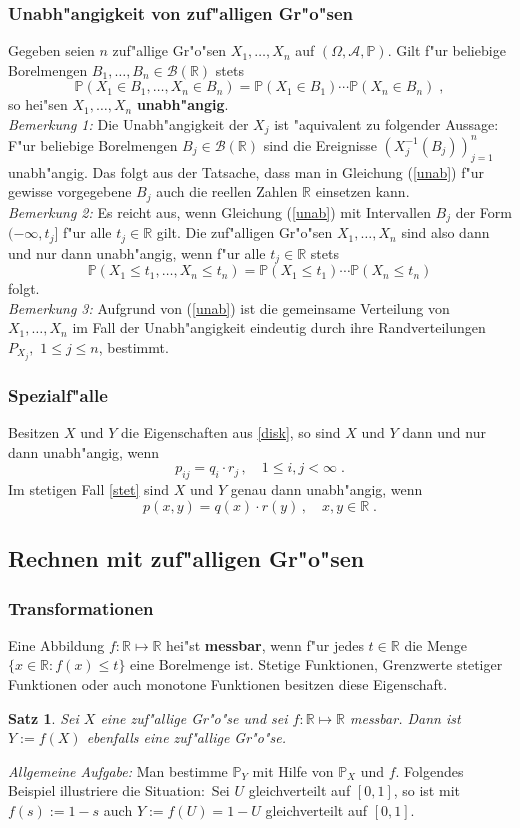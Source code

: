 \documentclass[ngerman,draft,parskip=half,twoside]{scrartcl}
\newtheorem{thm}{Satz}[section]
\newcommand*{\R}{\mathbb{R}}      %
\newcommand*{\Algeb}{\mathcal{A}}   %
\newcommand*{\BorelM}{\mathcal{B}}  %
\newcommand*{\WKM}{\mathbb{P}}      %
\begin{document}
\subsubsection{Unabh"angigkeit von zuf"alligen Gr"o"sen}
Gegeben seien $n$ zuf"allige Gr"o"sen $X_1,\ldots,X_n$ auf $(\Omega,\Algeb,\WKM)$. Gilt f"ur beliebige
Borelmengen $B_1,\ldots,B_n\in\BorelM(\R)$ stets
\begin{equation}
\label{unab}
\WKM(X_1\in B_1,\ldots,X_n\in B_n)=\WKM(X_1\in B_1)\cdots\WKM(X_n\in B_n)\;,
\end{equation}
so hei"sen $X_1,\ldots,X_n$ \textbf{unabh"angig}.\\
\textit{Bemerkung 1:} Die Unabh"angigkeit der $X_j$ ist "aquivalent zu folgender Aussage$\colon$ F"ur
beliebige Borelmengen $B_j\in\BorelM(\R)$ sind die Ereignisse $\left(X_j^{-1}(B_j)\right)_{j=1}^n$
unabh"angig. Das folgt aus der Tatsache, dass man in Gleichung (\ref{unab}) f"ur gewisse vorgegebene $B_j$ auch die
reellen Zahlen $\R$ einsetzen kann.\\
\textit{Bemerkung 2:} Es reicht aus, wenn Gleichung (\ref{unab}) mit Intervallen $B_j$ der Form
$(-\infty,t_j]$ f"ur alle $t_j\in\R$ gilt. Die zuf"alligen Gr"o"sen $X_1,\ldots,X_n$ sind also
dann und nur dann unabh"angig, wenn f"ur alle $t_j\in\R$ stets
$$
\WKM(X_1\le t_1,\ldots,X_n\le t_n)=\WKM(X_1\le t_1)\cdots\WKM(X_n\le t_n)
$$
folgt.\\
\textit{Bemerkung 3:} Aufgrund von (\ref{unab}) ist die gemeinsame Verteilung von $X_1,\ldots,X_n$
im Fall der Unabh"angigkeit eindeutig durch
ihre Randverteilungen $P_{X_j},$ $1\le j\le n$, bestimmt.
\subsubsection{Spezialf"alle}
Besitzen $X$ und $Y$ die Eigenschaften aus \ref{disk}, so sind $X$ und $Y$ dann und nur  dann
unabh"angig, wenn
$$
p_{ij}=q_i\cdot r_j\,,\quad 1\le i,j<\infty\;.
$$
Im stetigen Fall \ref{stet} sind $X$ und $Y$ genau dann unabh"angig, wenn
$$
p(x,y)=q(x)\cdot r(y)\,,\quad x,y\in\R\;.
$$
\subsection{Rechnen mit zuf"alligen Gr"o"sen}
\subsubsection{Transformationen}
Eine Abbildung $f\colon\R\mapsto\R$ hei"st \textbf{messbar}, wenn f"ur jedes $t\in\R$ die
Menge $\{x\in \R : f(x)\le t\}$ eine Borelmenge ist. Stetige Funktionen, Grenzwerte stetiger
Funktionen oder auch monotone Funktionen besitzen diese Eigenschaft.
\begin{thm}
Sei $X$ eine zuf"allige Gr"o"se und sei $f\colon\R\mapsto\R$ messbar. Dann ist $Y:=f(X)$ ebenfalls
eine zuf"allige Gr"o"se.
\end{thm}
\textit{Allgemeine Aufgabe:} Man bestimme $\WKM_Y$ mit Hilfe von $\WKM_X$ und $f$.
Folgendes Beispiel illustriere die Situation$\colon$ Sei $U$ gleichverteilt auf $[0,1]$, so ist mit
$f(s):=1-s$ auch $Y:=f(U)=1-U$ gleichverteilt auf $[0,1]$.
\end{document}
